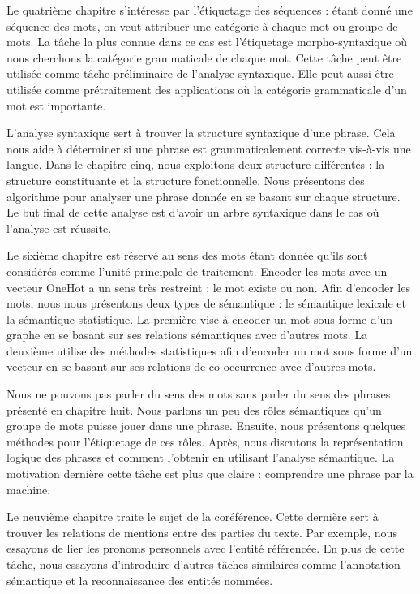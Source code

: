 \documentclass{KodeBook}
\begin{document}
Le quatrième chapitre s'intéresse par l'étiquetage des séquences : étant donné une séquence des mots, on veut attribuer une catégorie à chaque mot ou groupe de mots.
La tâche la plus connue dans ce cas est l'étiquetage morpho-syntaxique où nous cherchons la catégorie grammaticale de chaque mot.
Cette tâche peut être utilisée comme tâche préliminaire de l'analyse syntaxique.
Elle peut aussi être utilisée comme prétraitement des applications où la catégorie grammaticale d'un mot est importante.


L'analyse syntaxique sert à trouver la structure syntaxique d'une phrase.
Cela nous aide à déterminer si une phrase est grammaticalement correcte vis-à-vis une langue.
Dans le chapitre cinq, nous exploitons deux structure différentes : la structure constituante et la structure fonctionnelle.
Nous présentons des algorithme pour analyser une phrase donnée en se basant sur chaque structure.
Le but final de cette analyse est d'avoir un arbre syntaxique dans le cas où l'analyse est réussite.


Le sixième chapitre est réservé au sens des mots étant donnée qu'ils sont considérés comme l'unité principale de traitement.
Encoder les mots avec un vecteur OneHot a un sens très restreint : le mot existe ou non.
Afin d'encoder les mots, nous nous présentons deux types de sémantique : le sémantique lexicale et la sémantique statistique.
La première vise à encoder un mot sous forme d'un graphe en se basant sur ses relations sémantiques avec d'autres mots.
La deuxième utilise des méthodes statistiques afin d'encoder un mot sous forme d'un vecteur en se basant sur ses relations de co-occurrence avec d'autres mots.


Nous ne pouvons pas parler du sens des mots sans parler du sens des phrases présenté en chapitre huit.
Nous parlons un peu des rôles sémantiques qu'un groupe de mots puisse jouer dans une phrase.
Ensuite, nous présentons quelques méthodes pour l'étiquetage de ces rôles.
Après, nous discutons la représentation logique des phrases et comment l'obtenir en utilisant l'analyse sémantique.
La motivation dernière cette tâche est plus que claire : comprendre une phrase par la machine.


Le neuvième chapitre traite le sujet de la coréférence.
Cette dernière sert à trouver les relations de mentions entre des parties du texte.
Par exemple, nous essayons de lier les pronoms personnels avec l'entité référencée.
En plus de cette tâche, nous essayons d'introduire d'autres tâches similaires comme l'annotation sémantique et la reconnaissance des entités nommées.
\end{document}
